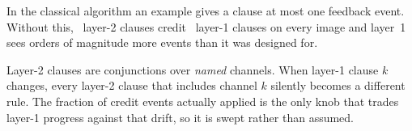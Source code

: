  In the classical algorithm an example gives a
clause at most one feedback event. Without this, \cTwo\ layer-2 clauses credit \cOne\ layer-1
clauses on every image and layer~1 sees orders of magnitude more events than it was designed
for.

 Layer-2 clauses are conjunctions over \emph{named} channels. When layer-1
clause $k$ changes, every layer-2 clause that includes channel $k$ silently becomes a different
rule. The fraction of credit events actually applied is the only knob that trades layer-1
progress against that drift, so it is swept rather than assumed.
